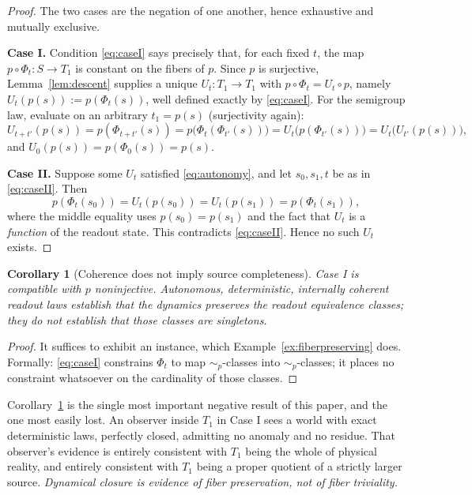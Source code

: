 \documentclass[11pt,reqno]{amsart}
\theoremstyle{plain}
\newtheorem{corollary}[theorem]{Corollary}
\theoremstyle{definition}
\theoremstyle{remark}
\begin{document}
\begin{proof}
The two cases are the negation of one another, hence exhaustive and mutually exclusive.

\textbf{Case I.} Condition \eqref{eq:caseI} says precisely that, for each fixed $t$, the map $p\circ\Phi_t\colon S\to T_1$ is constant on the fibers of $p$. Since $p$ is surjective, Lemma~\ref{lem:descent} supplies a unique $U_t\colon T_1\to T_1$ with $p\circ\Phi_t=U_t\circ p$, namely $U_t(p(s)):=p(\Phi_t(s))$, well defined exactly by \eqref{eq:caseI}. For the semigroup law, evaluate on an arbitrary $t_1=p(s)$ (surjectivity again):
\[
U_{t+t'}(p(s))=p(\Phi_{t+t'}(s))=p\bigl(\Phi_t(\Phi_{t'}(s))\bigr)=U_t\bigl(p(\Phi_{t'}(s))\bigr)=U_t\bigl(U_{t'}(p(s))\bigr),
\]
and $U_0(p(s))=p(\Phi_0(s))=p(s)$.

\textbf{Case II.} Suppose some $U_t$ satisfied \eqref{eq:autonomy}, and let $s_0,s_1,t$ be as in \eqref{eq:caseII}. Then
\[
p(\Phi_t(s_0))=U_t(p(s_0))=U_t(p(s_1))=p(\Phi_t(s_1)),
\]
where the middle equality uses $p(s_0)=p(s_1)$ and the fact that $U_t$ is a \emph{function} of the readout state. This contradicts \eqref{eq:caseII}. Hence no such $U_t$ exists.
\end{proof}

\begin{corollary}[Coherence does not imply source completeness]\label{cor:coherence}
Case I is compatible with $p$ noninjective. Autonomous, deterministic, internally coherent readout laws establish that the dynamics \emph{preserves the readout equivalence classes}; they do \emph{not} establish that those classes are singletons.
\end{corollary}

\begin{proof}
It suffices to exhibit an instance, which Example~\ref{ex:fiberpreserving} does. Formally: \eqref{eq:caseI} constrains $\Phi_t$ to map $\sim_p$-classes into $\sim_p$-classes; it places no constraint whatsoever on the cardinality of those classes.
\end{proof}

Corollary~\ref{cor:coherence} is the single most important negative result of this paper, and the one most easily lost. An observer inside $T_1$ in Case I sees a world with exact deterministic laws, perfectly closed, admitting no anomaly and no residue. That observer's evidence is entirely consistent with $T_1$ being the whole of physical reality, and entirely consistent with $T_1$ being a proper quotient of a strictly larger source. \emph{Dynamical closure is evidence of fiber preservation, not of fiber triviality.}
\end{document}
